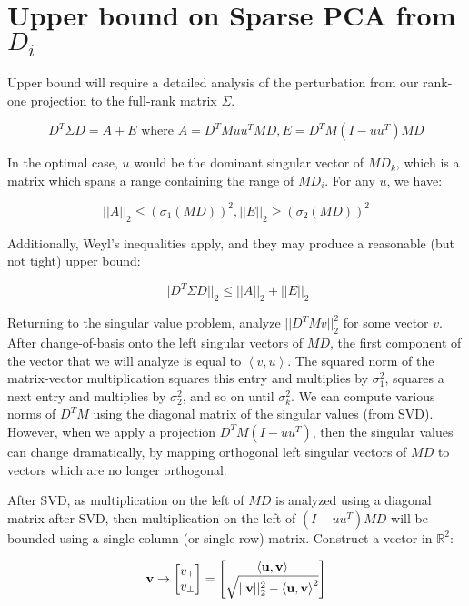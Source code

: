 \documentclass{article}
\def\tang{\ThisStyle{\abovebaseline[0pt]{\scalebox{-1}{$\SavedStyle\perp$}}}}
\begin{document}
\section{Upper bound on Sparse PCA from $D_i$}

Upper bound will require a detailed analysis of the perturbation from our rank-one projection to the full-rank matrix $\Sigma$.

$$
D^T \Sigma D = A + E \text{ where } A = D^T M uu^T MD, E = D^T M (I-uu^T) MD
$$

In the optimal case, $u$ would be the dominant singular vector of $MD_k$, which is a matrix which spans a range containing the range of $MD_i$. For any $u$, we have:

$$
||A||_2 \le \left(\sigma_1(MD)\right)^2,
||E||_2 \ge \left(\sigma_2(MD)\right)^2
$$

Additionally, Weyl's inequalities apply, and they may produce a reasonable (but not tight) upper bound:

$$
||D^T \Sigma D||_2 \le ||A||_2 + ||E||_2
$$

Returning to the singular value problem, analyze $||D^TM v||_2^2$ for some vector $v$. After change-of-basis onto the left singular vectors of $MD$, the first component of the vector that we will analyze is equal to $\left< v, u \right>$. The squared norm of the matrix-vector multiplication squares this entry and multiplies by $\sigma_1^2$, squares a next entry and multiplies by $\sigma_2^2$, and so on until $\sigma_k^2$. We can compute various norms of $D^TM$ using the diagonal matrix of the singular values (from SVD). However, when we apply a projection $D^TM(I-uu^T)$, then the singular values can change dramatically, by mapping orthogonal left singular vectors of $MD$ to vectors which are no longer orthogonal.

After SVD, as multiplication on the left of $MD$ is analyzed using a diagonal matrix after SVD, then multiplication on the left of $(I-uu^T)MD$ will be bounded using a single-column (or single-row) matrix. Construct a vector in $\mathbb{R}^2$:

$$\mathbf{v} \to \left[
    \begin{matrix}
        v_{\tang} \\ v_\perp
    \end{matrix}
\right]
=\left[
    \begin{matrix}
        \left<\mathbf{u},\mathbf{v}\right>
        \\
        \sqrt{||\mathbf{v}||_2^2 -
        \left<\mathbf{u},\mathbf{v}\right>^2}
    \end{matrix}
\right]
$$
\end{document}
